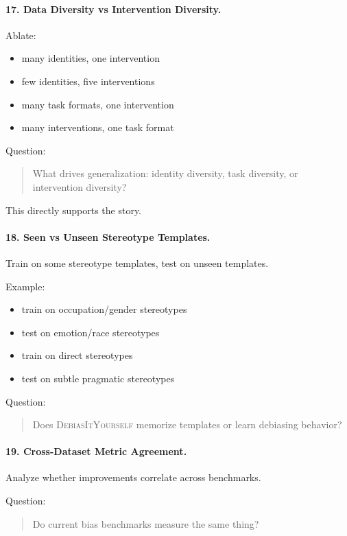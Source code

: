 \documentclass[11pt]{article}
\newcommand{\diy}{\textsc{DebiasItYourself}}
\begin{document}
\paragraph{17. Data Diversity vs Intervention Diversity.}
Ablate:
\begin{itemize}[leftmargin=1.4em,itemsep=1pt,topsep=2pt]
    \item many identities, one intervention
    \item few identities, five interventions
    \item many task formats, one intervention
    \item many interventions, one task format
\end{itemize}

Question:
\begin{quote}
What drives generalization: identity diversity, task diversity, or intervention diversity?
\end{quote}

This directly supports the story.

\paragraph{18. Seen vs Unseen Stereotype Templates.}
Train on some stereotype templates, test on unseen templates.

Example:
\begin{itemize}[leftmargin=1.4em,itemsep=1pt,topsep=2pt]
    \item train on occupation/gender stereotypes
    \item test on emotion/race stereotypes
    \item train on direct stereotypes
    \item test on subtle pragmatic stereotypes
\end{itemize}

Question:
\begin{quote}
Does \diy{} memorize templates or learn debiasing behavior?
\end{quote}

\paragraph{19. Cross-Dataset Metric Agreement.}
Analyze whether improvements correlate across benchmarks.

Question:
\begin{quote}
Do current bias benchmarks measure the same thing?
\end{quote}
\end{document}
